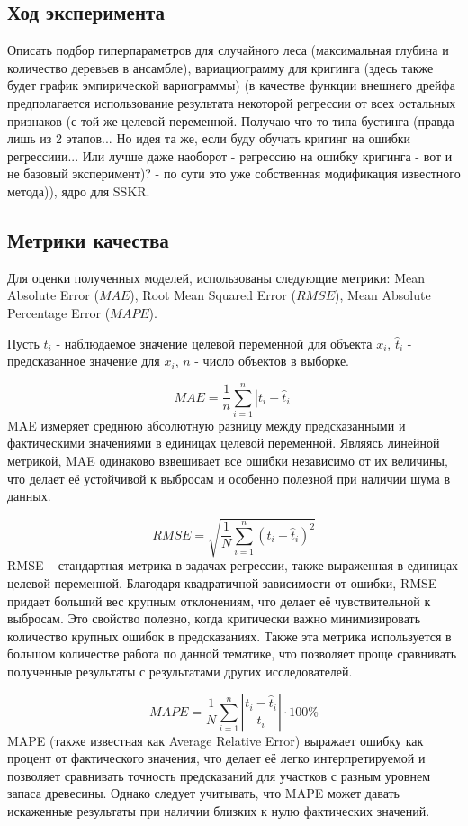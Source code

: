 \documentclass{article}
\begin{document}
\subsection{Ход эксперимента}
Описать подбор гиперпараметров для случайного леса (максимальная глубина и количество деревьев в ансамбле), вариациограмму для кригинга (здесь также будет график эмпирической вариограммы) (в качестве функции внешнего дрейфа предполагается использование результата некоторой регрессии от всех остальных признаков (с той же целевой переменной. Получаю что-то типа бустинга (правда лишь из 2 этапов... Но идея та же, если буду обучать кригинг на ошибки регрессиии... Или лучше даже наоборот - регрессию на ошибку кригинга - вот и не базовый эксперимент)? - по сути это уже собственная модификация известного метода)), ядро для SSKR.

\subsection{Метрики качества}
Для оценки полученных моделей, использованы следующие метрики: Mean Absolute Error ($MAE$), Root Mean Squared Error ($RMSE$), Mean Absolute Percentage Error ($MAPE$).

Пусть $t_i$ - наблюдаемое значение целевой переменной для объекта $x_i$, $\hat{t}_i$ - предсказанное значение для $x_i$, $n$ - число объектов в выборке.

$$MAE = \frac{1}{n}\sum_{i = 1}^n|t_i - \hat{t}_i|$$
MAE измеряет среднюю абсолютную разницу между предсказанными и фактическими значениями в единицах целевой переменной. Являясь линейной метрикой, MAE одинаково взвешивает все ошибки независимо от их величины, что делает её устойчивой к выбросам и особенно полезной при наличии шума в данных.

$$RMSE  = \sqrt{\frac{1}{N}\sum_{i=1}^n(t_i - \hat{t}_i)^2}$$
RMSE – стандартная метрика в задачах регрессии, также выраженная в единицах целевой переменной. Благодаря квадратичной зависимости от ошибки, RMSE придает больший вес крупным отклонениям, что делает её чувствительной к выбросам. Это свойство полезно, когда критически важно минимизировать количество крупных ошибок в предсказаниях. Также эта метрика используется в большом количестве работа по данной тематике, что позволяет проще сравнивать полученные результаты с результатами других исследователей.

$$MAPE = \frac{1}{N}\sum_{i=1}^n \left| \frac{t_i - \hat{t}_i}{t_i} \right| \cdot 100 \%$$
MAPE (также известная как Average Relative Error) выражает ошибку как процент от фактического значения, что делает её легко интерпретируемой и позволяет сравнивать точность предсказаний для участков с разным уровнем запаса древесины. Однако следует учитывать, что MAPE может давать искаженные результаты при наличии близких к нулю фактических значений.
\end{document}
